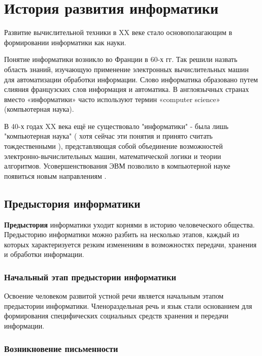 \chapter{История развития информатики} \label{chapt1}

Развитие вычислительной техники в XX веке стало основополагающим в  формировании информатики как науки.

Понятие информатики возникло  во Франции в 60-х гг. Так решили назвать область знаний, изучающую применение электронных вычислительных машин для автоматизации обработки информации. Слово информатика образовано путем слияния французских слов информация и автоматика. В англоязычных странах вместо «информатики» часто используют термин «computer science» (компьютерная наука).

В 40-х годах XX века ещё не существовало "информатики" - была лишь "компьютерная наука" ( хотя сейчас эти понятия и принято считать тождественными ), представляющая собой объединение возможностей электронно-вычислительных машин, математической логики и теории алгоритмов. Усовершенствования ЭВМ позволило в компьютерной науке появиться новым направлениям \cite{bib102}.


\section{Предыстория информатики} \label{sect1_1}

\textbf{Предыстория} информатики уходит корнями в историю человеческого общества. Предысторию информатики можно разбить на несколько этапов, каждый из которых характеризуется резким изменениям в возможностях передачи, хранения и обработки информации.

\subsection{Начальный этап предыстории информатики} \label{subsect1_1_1}

Освоение человеком развитой устной речи является начальным этапом предыстории информатики. Членораздельная речь и язык стали основанием для формирования специфических социальных средств хранения и передачи информации. 

\subsection{Возникновение письменности} \label{subsect1_1_2}

